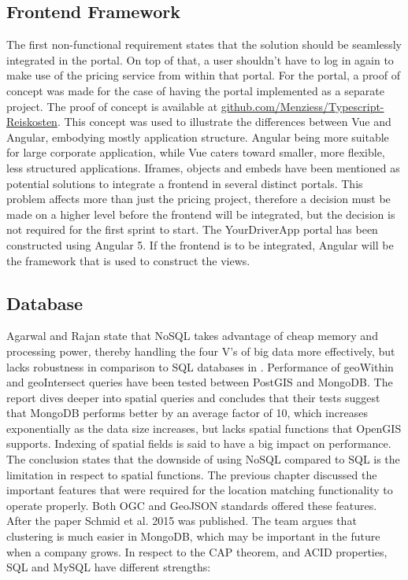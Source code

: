 \subsection{Frontend Framework}
The first non-functional requirement states that the solution should be seamlessly integrated in the portal. On top of that, a user shouldn’t have to log in again to make use of the pricing service from within that portal. For the portal, a proof of concept was made for the case of having the portal implemented as a separate project. The proof of concept is available at \url{github.com/Menziess/Typescript-Reiskosten}. This concept was used to illustrate the differences between Vue and Angular, embodying mostly application structure. Angular being more suitable for large corporate application, while Vue caters toward smaller, more flexible, less structured applications. Iframes, objects and embeds have been mentioned as potential solutions to integrate a frontend in several distinct portals. This problem affects more than just the pricing project, therefore a decision must be made on a higher level before the frontend will be integrated, but the decision is not required for the first sprint to start. The YourDriverApp portal has been constructed using Angular 5. If the frontend is to be integrated, Angular will be the framework that is used to construct the views.

\subsection{Database}
Agarwal and Rajan state that NoSQL takes advantage of cheap memory and processing power, thereby handling the four V’s of big data more effectively, but lacks robustness in comparison to SQL databases in \cite{AGS}. Performance of geoWithin and geoIntersect queries have been tested between PostGIS and MongoDB. The report dives deeper into spatial queries and concludes that their tests suggest that MongoDB performs better by an average factor of 10, which increases exponentially as the data size increases, but lacks spatial functions that OpenGIS supports. Indexing of spatial fields is said to have a big impact on performance. The conclusion states that the downside of using NoSQL compared to SQL is the limitation in respect to spatial functions. The previous chapter discussed the important features that were required for the location matching functionality to operate properly. Both OGC and GeoJSON standards offered these features. After the paper Schmid et al. 2015 \cite{SCS} was published. The team argues that clustering is much easier in MongoDB, which may be important in the future when a company grows. In respect to the CAP theorem, and ACID properties, SQL and MySQL have different strengths:

